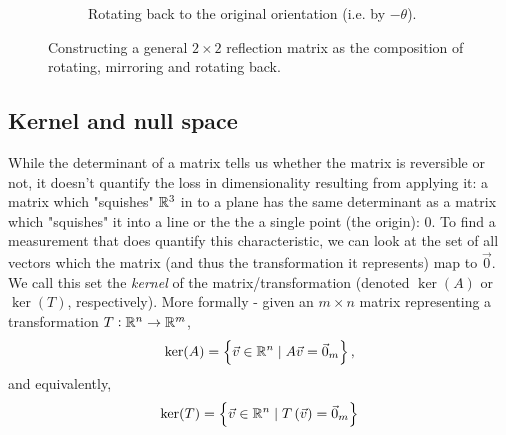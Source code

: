 \begin{figure}[]
	\begin{subfigure}[c]{0.45\textwidth}
		\caption{Rotating back to the original orientation (i.e. by $-\theta$).}
	\end{subfigure}
	\caption{Constructing a general $2\times2$ reflection matrix as the composition of rotating, mirroring and rotating back.}
	\label{fig:building_reflect_2x2}
\end{figure}

\subsection{Kernel and null space}
While the determinant of a matrix tells us whether the matrix is reversible or not, it doesn't quantify the loss in dimensionality resulting from applying it: a matrix which "squishes" $\mathbb{R}^{3}$ in to a plane has the same determinant as a matrix which "squishes" it into a line or the the a single point (the origin): $0$. To find a measurement that does quantify this characteristic, we can look at the set of all vectors which the matrix (and thus the transformation it represents) map to $\vec{0}$. We call this set the \emph{kernel} of the matrix/transformation (denoted $\ker(A)$ or $\ker(T)$, respectively). More formally - given an $m\times n$ matrix representing a transformation $T:\mathbb{R}^{n}\to\mathbb{R}^{m}$,
\begin{equation}
	\ker(A) = \left\{ \vec{v}\in\mathbb{R}^{n} \mid A\vec{v}=\vec{0}_{m} \right\},
	\label{eq:kernel_matrix}
\end{equation}
and equivalently,
\begin{equation}
	\ker(T) = \left\{ \vec{v}\in\mathbb{R}^{n} \mid T \left( \vec{v} \right) =\vec{0}_{m} \right\}
	\label{eq:kernel_transformation}
\end{equation}

